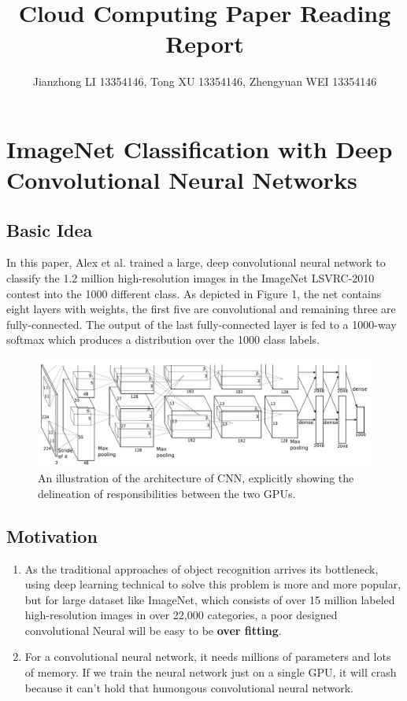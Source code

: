 \documentclass[a4paper]{article}
\title{Cloud Computing Paper Reading Report}
\author{Jianzhong LI 13354146, Tong XU 13354146, Zhengyuan WEI 13354146}
\begin{document}
  \maketitle
  \section{ImageNet Classification with Deep Convolutional Neural Networks}
      \subsection{Basic Idea}
      
          In this paper, Alex et al. trained a large, deep convolutional neural network to classify the 1.2 million high-resolution images in the ImageNet LSVRC-2010 contest into the 1000 different class. As depicted in Figure 1, the net contains eight layers with weights, the first five are convolutional and remaining three are fully-connected. The output of the last fully-connected layer is fed to a 1000-way softmax which produces a distribution over the 1000 class labels.
      
      \begin{figure}[h]
      \centering
      \includegraphics[width=0.7\linewidth]{screenshot002}
      \caption{An illustration of the architecture of CNN, explicitly showing the delineation of responsibilities between the two GPUs.}
      \label{fig:screenshot002}
      \end{figure}

      
      \subsection{Motivation}
      
      \begin{enumerate}
          \item As the traditional approaches of object recognition arrives its bottleneck, using deep learning technical to solve this problem is more and more popular, but for large dataset like ImageNet, which consists of over 15 million labeled high-resolution images in over 22,000 categories, a poor designed convolutional Neural will be easy to be \textbf{over fitting}.
          \item For a convolutional neural network, it needs millions of parameters and lots of memory. If we train the neural network just on a single GPU, it will crash because it can't hold that humongous convolutional neural network.
      \end{enumerate}
      
\end{document}
